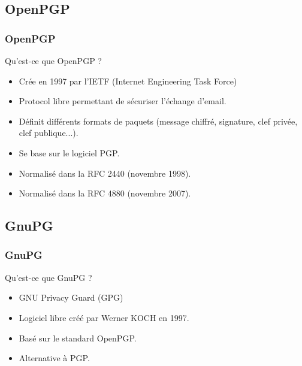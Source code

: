 \subsection{OpenPGP}
\begin{frame}
    \frametitle{\color{white}OpenPGP}
    \begin{block}{Qu'est-ce que OpenPGP ?}
    	\begin{itemize}
    	 \item Crée en 1997 par l'IETF (Internet Engineering Task Force)
    	 \item Protocol libre permettant de sécuriser l'échange d'email.
    	 \item Définit différents formats de paquets (message chiffré, signature, clef privée, clef publique...).
    	 \item Se base sur le logiciel PGP.
    	 \item Normalisé dans la RFC 2440 (novembre 1998).
         \item Normalisé dans la RFC 4880 (novembre 2007).
       \end{itemize} 
    \end{block}
\end{frame}

\subsection{GnuPG}
\begin{frame}
    \frametitle{\color{white}GnuPG}
    \begin{block}{Qu'est-ce que GnuPG ?}
      \begin{itemize}
        \item GNU Privacy Guard (GPG)
        \item Logiciel libre créé par Werner KOCH en 1997.
        \item Basé sur le standard OpenPGP.
        \item Alternative à PGP.
      \end{itemize}
    \end{block}
\end{frame}